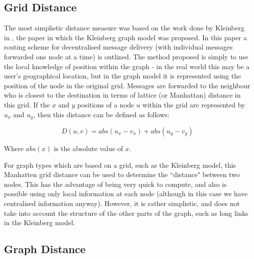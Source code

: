 \documentclass[bsc,frontabs,twoside,singlespacing,parskip,deptreport]{infthesis}     %
\begin{document}
\subsection{Grid Distance}
The most simplistic distance measure was based on the work done by Kleinberg in \cite{Kleinberg00}, the paper in which the Kleinberg graph model was proposed. In this paper a routing scheme for decentralised message delivery (with individual messages forwarded one node at a time) is outlined. The method proposed is simply to use the local knowledge of position within the graph - in the real world this may be a user's geographical location, but in the graph model it is represented using the position of the node in the original grid. Messages are forwarded to the neighbour who is closest to the destination in terms of lattice (or Manhattan) distance in this grid. If the $x$ and $y$ positions of a node $u$ within the grid are represented by $u_{x}$ and $u_{y}$, then this distance can be defined as follows:

\begin{equation}
D(u, v) = abs(u_{x} - v_{x}) + abs(u_{y} - v_{y})
\end{equation}

Where $abs(x)$ is the absolute value of $x$.

For graph types which are based on a grid, such as the Kleinberg model, this Manhatten grid distance can be used to determine the ``distance" between two nodes. This has the advantage of being very quick to compute, and also is possible using only local information at each node (although in this case we have centralised information anyway). However, it is rather simplistic, and does not take into account the structure of the other parts of the graph, such as long links in the Kleinberg model.

\pagebreak
\subsection{Graph Distance} \label{subsec:graph_dist}
\end{document}
